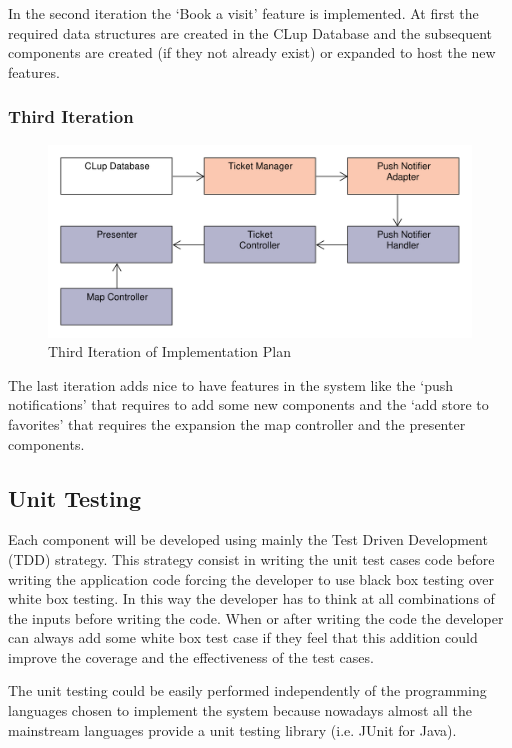 In the second iteration the `Book a visit' feature is implemented. At first the required data structures are created in the CLup Database and the subsequent components are created (if they not already exist) or expanded to host the new features.

\subsubsection{Third Iteration}
\begin{figure}[H]
    \includegraphics[width=\textwidth]{Images/Impl_Plan_3.pdf}
    \caption{\label{fig:UML_virtual_ticket_sequence}Third Iteration of Implementation Plan}
\end{figure}

The last iteration adds nice to have features in the system like the `push notifications' that requires to add some new components and the `add store to favorites' that requires the expansion the map controller and the presenter components.

\subsection{Unit Testing}
Each component will be developed using mainly the Test Driven Development (TDD) strategy. This strategy consist in writing the unit test cases code before writing the application code forcing the developer to use black box testing over white box testing. In this way the developer has to think at all combinations of the inputs before writing the code. When or after writing the code the developer can always add some white box test case if they feel that this addition could improve the coverage and the effectiveness of the test cases.

The unit testing could be easily performed independently of the programming languages chosen to implement the system because nowadays almost all the mainstream languages provide a unit testing library (i.e. JUnit for Java).

